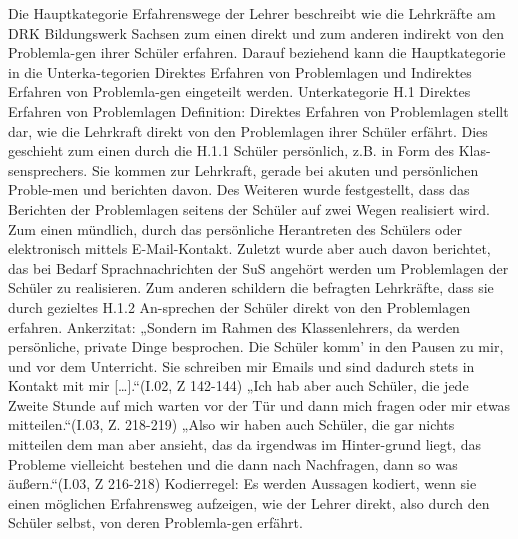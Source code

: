 Die Hauptkategorie Erfahrenswege der Lehrer beschreibt wie die Lehrkräfte am DRK Bildungswerk Sachsen zum einen direkt und zum anderen indirekt von den Problemla-gen ihrer Schüler erfahren. Darauf beziehend kann die Hauptkategorie in die Unterka-tegorien Direktes Erfahren von Problemlagen und Indirektes Erfahren von Problemla-gen eingeteilt werden.
Unterkategorie H.1 Direktes Erfahren von Problemlagen 
Definition: Direktes Erfahren von Problemlagen stellt dar, wie die Lehrkraft direkt von den Problemlagen ihrer Schüler erfährt. 
Dies geschieht zum einen durch die H.1.1 Schüler persönlich, z.B. in Form des Klas-sensprechers. Sie kommen zur Lehrkraft, gerade bei akuten und persönlichen Proble-men und berichten davon. Des Weiteren wurde festgestellt, dass das Berichten der Problemlagen seitens der Schüler auf zwei Wegen realisiert wird. Zum einen mündlich, durch das persönliche Herantreten des Schülers oder elektronisch mittels E-Mail-Kontakt. Zuletzt wurde aber auch davon berichtet, das bei Bedarf Sprachnachrichten der SuS angehört werden um Problemlagen der Schüler zu realisieren. 
Zum anderen schildern die befragten Lehrkräfte, dass sie durch gezieltes H.1.2 An-sprechen der Schüler direkt von den Problemlagen erfahren.
Ankerzitat: „Sondern im Rahmen des Klassenlehrers, da werden persönliche, private Dinge besprochen. Die Schüler komm’ in den Pausen zu mir, und vor dem Unterricht. Sie schreiben mir Emails und sind dadurch stets in Kontakt mit mir […].“(I.02, Z 142-144) „Ich hab aber auch Schüler, die jede Zweite Stunde auf mich warten vor der Tür und dann mich fragen oder mir etwas mitteilen.“(I.03, Z. 218-219) „Also wir haben auch Schüler, die gar nichts mitteilen dem man aber ansieht, das da irgendwas im Hinter-grund liegt, das Probleme vielleicht bestehen und die dann nach Nachfragen, dann so was äußern.“(I.03, Z 216-218)
Kodierregel: Es werden Aussagen kodiert, wenn sie einen möglichen Erfahrensweg aufzeigen, wie der Lehrer direkt, also durch den Schüler selbst, von deren Problemla-gen erfährt.

